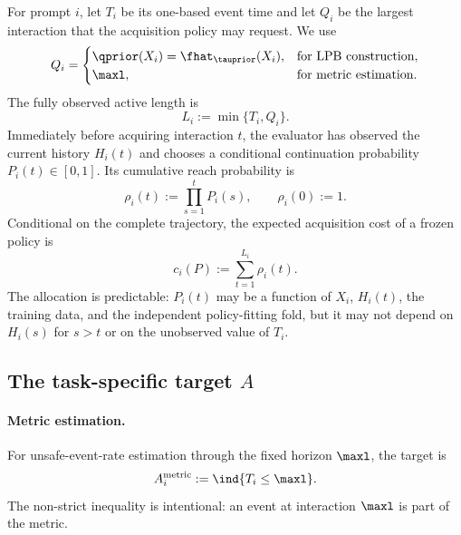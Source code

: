 For prompt $i$, let $T_i$ be its one-based event time and let $Q_i$ be the
largest interaction that the acquisition policy may request.  We use
\begin{equation}
    Q_i=
    \begin{cases}
        \qprior(X_i)=\fhat_{\tauprior}(X_i),&\text{for LPB construction},\\
        \maxl,&\text{for metric estimation}.
    \end{cases}
    \label{eq:spgd_acquisition_horizon}
\end{equation}
The fully observed active length is
\begin{equation}
    L_i:=\min\{T_i,Q_i\}.
\end{equation}
Immediately before acquiring interaction $t$, the evaluator has observed the
current history $H_i(t)$ and chooses a conditional continuation probability
$P_i(t)\in[0,1]$.  Its cumulative reach probability is
\begin{equation}
    \rho_i(t):=\prod_{s=1}^{t}P_i(s),
    \qquad \rho_i(0):=1.
    \label{eq:spgd_cumulative_reach}
\end{equation}
Conditional on the complete trajectory, the expected acquisition cost of a
frozen policy is
\begin{equation}
    c_i(P):=\sum_{t=1}^{L_i}\rho_i(t).
    \label{eq:spgd_row_cost}
\end{equation}
The allocation is predictable: $P_i(t)$ may be a function of $X_i$,
$H_i(t)$, the training data, and the independent policy-fitting fold, but it
may not depend on $H_i(s)$ for $s>t$ or on the unobserved value of $T_i$.

\subsection{The task-specific target $A$}
\label{sec:spgd_task_target}

\paragraph{Metric estimation.}
For unsafe-event-rate estimation through the fixed horizon $\maxl$, the target
is
\begin{equation}
    A_i^{\mathrm{metric}}
    :=\ind{T_i\leq\maxl}.
    \label{eq:spgd_metric_target}
\end{equation}
The non-strict inequality is intentional: an event at interaction $\maxl$ is
part of the metric.

